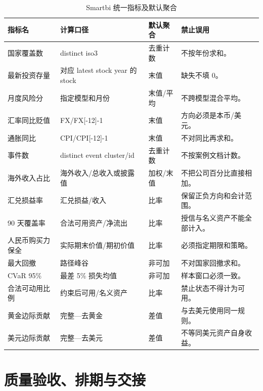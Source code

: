 \documentclass[UTF8,fontset=windows,12pt,openany]{ctexbook}
\begin{document}
\begin{longtable}{p{3.7cm}p{4.4cm}p{3.0cm}p{2.9cm}}
\caption{Smartbi 统一指标及默认聚合}\label{tab:semantic-metrics}\\
\toprule
\textbf{指标名} & \textbf{计算口径} & \textbf{默认聚合} & \textbf{禁止误用}\\
\midrule
国家覆盖数 & distinct iso3 & 去重计数 & 不按年份求和。\\
最新投资存量 & 对应 latest stock year 的 stock & 末值 & 缺失不填 0。\\
月度风险分 & 指定模型和月份 & 末值/平均 & 不跨模型混合平均。\\
汇率同比贬值 & FX/FX[-12]-1 & 末值 & 方向必须是本币/美元。\\
通胀同比 & CPI/CPI[-12]-1 & 末值 & 不对同比再求和。\\
事件数 & distinct event cluster/id & 去重计数 & 不按案例文档计数。\\
海外收入占比 & 海外收入/总收入或披露值 & 加权/末值 & 不把公司百分比直接相加。\\
汇兑损益率 & 汇兑损益/收入 & 比率 & 保留正负方向和会计范围。\\
90 天覆盖率 & 合法可用资产/净流出 & 比率 & 授信与名义资产不能全部计入。\\
人民币购买力保全 & 实际期末价值/期初价值 & 比率 & 必须指定期限和策略。\\
最大回撤 & 路径峰谷 & 非可加 & 不对国家回撤求和。\\
CVaR 95\% & 最差 5\% 损失均值 & 非可加 & 样本窗口必须一致。\\
合法可动用比例 & 约束后可用/名义资产 & 比率 & 禁止状态不得计为可用。\\
黄金边际贡献 & 完整—去黄金 & 差值 & 与去美元使用同一规则。\\
美元边际贡献 & 完整—去美元 & 差值 & 不等同美元资产自身收益。\\
\bottomrule
\end{longtable}

\part{质量验收、排期与交接}
\end{document}
